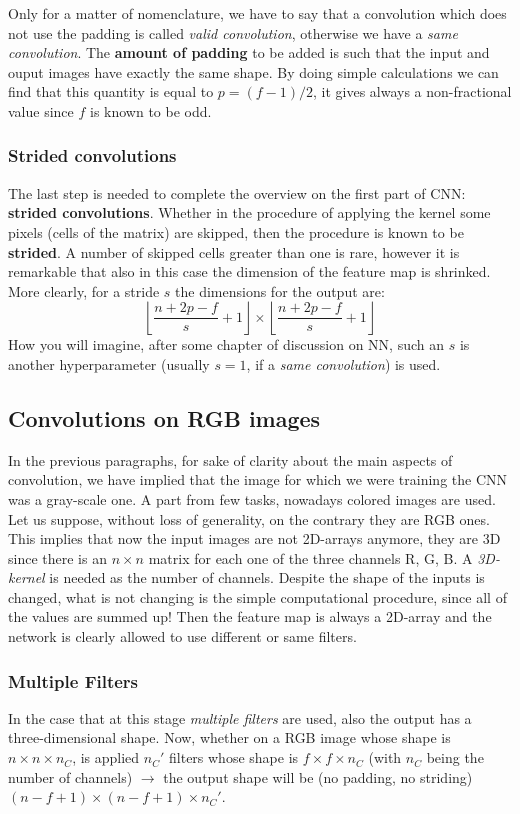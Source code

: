 Only for a matter of nomenclature, we have to say that a convolution which does not use the padding is called \textit{valid convolution}, otherwise we have a \textit{same convolution}. The \textbf{amount of padding} to be added is such that the input and ouput images have exactly the same shape. By doing simple calculations we can find that this quantity is equal to $p=(f-1)/2$, it gives always a non-fractional value since $f$ is known to be odd.
  
\subsubsection{Strided convolutions}
The last step is needed to complete the overview on the first part of CNN: \textbf{strided convolutions}. Whether in the procedure of applying the kernel some pixels (cells of the matrix) are skipped, then the procedure is known to be \textbf{strided}. A number of skipped cells greater than one is rare, however it is remarkable that also in this case the dimension of the feature map is shrinked. More clearly, for a stride $s$ the dimensions for the output are: 
\begin{equation*}
    \left\lfloor \frac{n+2p-f}{s}+1\right\rfloor\times
    \left\lfloor \frac{n+2p-f}{s}+1\right\rfloor
\end{equation*}
How you will imagine, after some chapter of discussion on NN, such an $s$ is another hyperparameter (usually $s=1$, if a \textit{same convolution}) is used.

\subsection{Convolutions on RGB images}
In the previous paragraphs, for sake of clarity about the main aspects of convolution, we have implied that the image for which we were training the CNN was a gray-scale one. A part from few tasks, nowadays colored images are used.
Let us suppose, without loss of generality, on the contrary they are RGB ones. This implies that now the input images are not 2D-arrays anymore, they are 3D since there is an $n\times{n}$ matrix for each one of the three channels R, G, B. A \textit{3D-kernel} is needed as the number of channels. Despite the shape of the inputs is changed, what is not changing is the simple computational procedure, since all of the values are summed up! Then the feature map is always a 2D-array and the network is clearly allowed to use different or same filters. 

\subsubsection{Multiple Filters}
In the case that at this stage \textit{multiple filters} are used, also the output has a three-dimensional shape.
Now, whether on a RGB image whose shape is ${n}\times{n}\times{n_C}$, is applied $n_C'$ filters whose shape is ${f}\times{f}\times{n_C}$ (with $n_C$ being the number of channels) $\to$ the output shape will be (no padding, no striding) $(n-f+1)\times(n-f+1)\times{n_C'}$.\\

